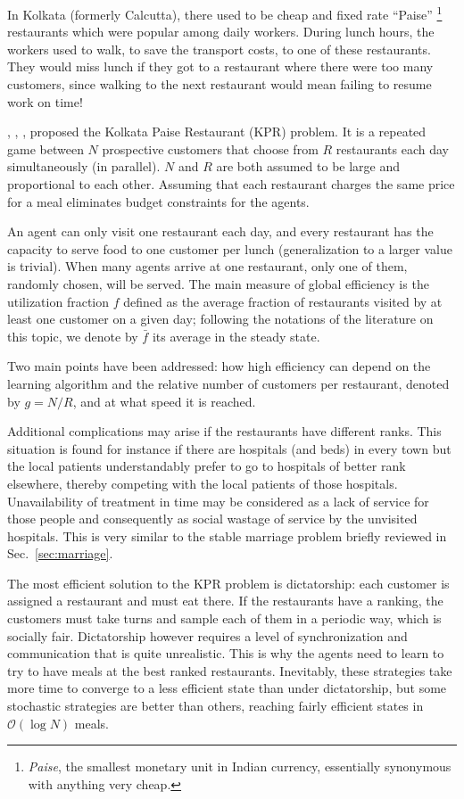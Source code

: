 \documentclass[aps,twocolumn,nofootinbib,sortedaddress,reprint]{revtex4-1}
\begin{document}
In Kolkata (formerly Calcutta), there used to be cheap and fixed
rate ``Paise'' \footnote{\textit{Paise}, the smallest monetary unit in
  Indian currency, essentially synonymous with anything very cheap.}
restaurants which were popular among daily workers.  During lunch
hours, the workers used to walk, to save the transport costs, to one
of these restaurants. They would miss lunch if they got to a
restaurant where there were too many customers, since walking to the
next restaurant would mean failing to resume work on time!

\textcite{kpr-physica}, \textcite{mathematica}, \textcite{kpr-proc}, \textcite{kpr-njp} proposed the Kolkata Paise Restaurant (KPR) problem. It is
a repeated game between $N$ prospective
customers that choose from $R$ restaurants each day
simultaneously (in parallel).  $N$ and $R$ are both assumed to be large and proportional to each other.
Assuming that each restaurant charges the same price for a meal eliminates budget constraints for the agents.

An agent can only visit one restaurant each day, and every restaurant
has the capacity to serve food to one customer per lunch
(generalization to a larger value is trivial).  When many agents
arrive at one restaurant, only one of them, randomly chosen, will be served. The main measure of global efficiency is the utilization fraction $f$ defined as the average fraction of restaurants visited by at least one customer on a given day; following the notations of the literature on this topic, we denote by $\bar{f}$ its average in the steady state.

Two main points have been addressed: how high  efficiency can depend on the learning algorithm and the relative number of customers per restaurant, denoted by $g=N/R$, and at what speed it is reached.

Additional complications may arise if the restaurants have different
ranks.  This situation is found for instance if
there are hospitals (and beds) in every town but the local
patients understandably prefer to go to hospitals of better rank
elsewhere, thereby competing with the local patients of those
hospitals.  Unavailability of treatment in time may be considered as a
lack of service for those people and consequently as social wastage
of service by the unvisited hospitals. This is very similar to the stable marriage problem briefly reviewed in Sec.\ \ref{sec:marriage}.

The most efficient solution to the KPR problem is dictatorship: each customer
is assigned a restaurant and must eat there. If the restaurants have a ranking,  the customers must take turns and
sample each of them in a periodic way, which is socially fair. Dictatorship however requires a
level of synchronization and communication that is quite unrealistic. This is why the agents need to learn to try to have meals at the best ranked restaurants. Inevitably, these strategies take
 more time to converge to a less efficient state than under dictatorship, but some stochastic strategies are  better than others, reaching fairly efficient states in $\mathcal{O}(\log N)$ meals.
\end{document}
